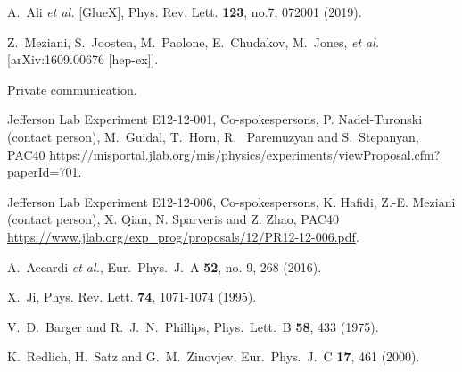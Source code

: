\documentclass[prd,amsmath,twocolumn,floatfix,amssymb, preprintnumbers, linenumbers,nofootinbib, superscriptaddress]{revtex4}
\begin{document}
\begin{thebibliography}{99}
A.~Ali \textit{et al.} [GlueX],
Phys. Rev. Lett. \textbf{123}, no.7, 072001 (2019). 

Z.~Meziani, S.~Joosten, M.~Paolone, E.~Chudakov, M.~Jones, {\it et al.}
[arXiv:1609.00676 [hep-ex]].

Private communication.

Jefferson Lab Experiment E12-12-001, Co-spokespersons, P. Nadel-Turonski (contact person),  M.~Guidal, T.~Horn, R. ~Paremuzyan and S.~Stepanyan, PAC40 \url{https://misportal.jlab.org/mis/physics/experiments/viewProposal.cfm?paperId=701}.

Jefferson Lab Experiment E12-12-006, Co-spokespersons, K. Hafidi, Z.-E. Meziani (contact person), X. Qian, N. Sparveris and Z. Zhao, PAC40 \url{https://www.jlab.org/exp_prog/proposals/12/PR12-12-006.pdf}.

  A.~Accardi {\it et al.},
  Eur.\ Phys.\ J.\ A {\bf 52}, no. 9, 268 (2016).

X.~Ji,
Phys. Rev. Lett. \textbf{74}, 1071-1074 (1995). 

  

  V.~D.~Barger and R.~J.~N.~Phillips,
  Phys.\ Lett.\ B {\bf 58}, 433 (1975).
  

  K.~Redlich, H.~Satz and G.~M.~Zinovjev,
  Eur.\ Phys.\ J.\ C {\bf 17}, 461 (2000).


\end{thebibliography}
\end{document}
